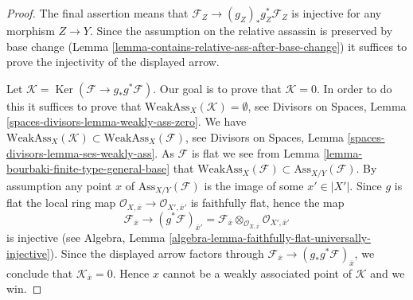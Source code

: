 \documentclass[10pt,a4paper]{amsart}
\theoremstyle{plain}
\theoremstyle{definition}
\theoremstyle{remark}
\numberwithin{equation}{subsection}
\def\Ker{\mathop{\mathrm{Ker}}}
\begin{document}
\begin{proof}
The final assertion means that $\mathcal{F}_Z \to (g_Z)_*g_Z^*\mathcal{F}_Z$
is injective for any morphism $Z \to Y$. Since the assumption on
the relative assassin is preserved by base change
(Lemma \ref{lemma-contains-relative-ass-after-base-change})
it suffices to prove the injectivity of the displayed arrow.

\medskip\noindent
Let $\mathcal{K} = \Ker(\mathcal{F} \to g_*g^*\mathcal{F})$.
Our goal is to prove that $\mathcal{K} = 0$.
In order to do this it suffices to prove that
$\text{WeakAss}_X(\mathcal{K}) = \emptyset$, see
Divisors on Spaces, Lemma \ref{spaces-divisors-lemma-weakly-ass-zero}.
We have
$\text{WeakAss}_X(\mathcal{K}) \subset \text{WeakAss}_X(\mathcal{F})$, see
Divisors on Spaces, Lemma \ref{spaces-divisors-lemma-ses-weakly-ass}.
As $\mathcal{F}$ is flat we see from
Lemma \ref{lemma-bourbaki-finite-type-general-base}
that $\text{WeakAss}_X(\mathcal{F}) \subset \text{Ass}_{X/Y}(\mathcal{F})$.
By assumption any point $x$ of $\text{Ass}_{X/Y}(\mathcal{F})$
is the image of some $x' \in |X'|$. Since $g$ is flat the
local ring map
$\mathcal{O}_{X, \overline{x}} \to \mathcal{O}_{X', \overline{x}'}$
is faithfully flat, hence the map
$$
\mathcal{F}_{\overline{x}}
\longrightarrow
(g^*\mathcal{F})_{\overline{x}'} =
\mathcal{F}_{\overline{x}} \otimes_{\mathcal{O}_{X, \overline{x}}}
\mathcal{O}_{X', \overline{x}'}
$$
is injective (see
Algebra, Lemma \ref{algebra-lemma-faithfully-flat-universally-injective}).
Since the displayed arrow factors through
$\mathcal{F}_{\overline{x}} \to (g_*g^*\mathcal{F})_{\overline{x}}$,
we conclude that
$\mathcal{K}_{\overline{x}} = 0$. Hence $x$ cannot be a weakly associated
point of $\mathcal{K}$ and we win.
\end{proof}
\end{document}

